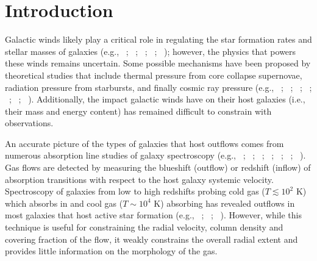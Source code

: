 \documentclass[trackchanges,twocolumn]{aastex62}
\newcommand{\citethnop}[1]{\citeauthor{#1}\ \citeyear{#1}}
\begin{document}

\section{Introduction}\label{sec:intro}
Galactic winds likely play a critical role in regulating the star formation rates and stellar masses of galaxies (e.g., \citethnop{SP1999}; \citethnop{Keres2009}; \citethnop{Oppenheimer2010}; \citethnop{Hopkins2014}; \citethnop{Werk_2014}); however, the physics that powers these winds remains uncertain. Some possible mechanisms have been proposed by theoretical studies that include thermal pressure from core collapse supernovae, radiation pressure from starbursts, and finally cosmic ray pressure (e.g., \citethnop{Larson_1974}; \citethnop{MO1977}; \citethnop{Chevalier_1985}; \citethnop{Breitschwerdt1991}; \citethnop{Springel_2003}; \citethnop{Murray2011}; \citethnop{Uhlig2012}).
Additionally, the impact galactic winds have on their host galaxies (i.e., their mass and energy content) has remained difficult to constrain with observations.

An accurate picture of the types of galaxies that host outflows comes from numerous absorption line studies of galaxy spectroscopy 
(e.g., \citethnop{Heckman2000}; \citethnop{Shapley2003}; \citethnop{Rupke2005b}; \citethnop{Veilleux2005}; \citethnop{Weiner2009}; \citethnop{Martin2012}; \citethnop{Rubin_2014}). Gas flows are detected by measuring the blueshift (outflow) or redshift (inflow) of absorption transitions with respect to the host galaxy systemic velocity. Spectroscopy of galaxies from low to high redshifts probing cold gas ($T \lesssim 10^2$ K) which absorbs in  and cool gas ($T \sim 10^4$ K) absorbing  has revealed outflows in most galaxies that host active star formation (e.g., \citethnop{chen2010}; \citethnop{Martin2012}; \citethnop{Rubin_2014}).
However, while this technique is useful for constraining the radial velocity, column density and covering fraction of the flow, it weakly constrains the overall radial extent and provides little information on the morphology of the gas.
\end{document}
